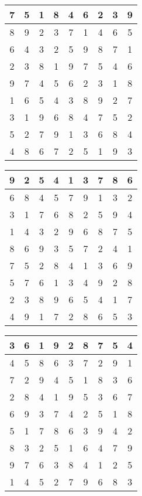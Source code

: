 \documentclass[]{article}
\begin{document}
\begin{table}[]
\begin{tabular}{c|c|c|c|c|c|c|c|c}
7 & 5 & 1 & 8 & 4 & 6 & 2 & 3 & 9 \\\hline
8 & 9 & 2 & 3 & 7 & 1 & 4 & 6 & 5 \\\hline
6 & 4 & 3 & 2 & 5 & 9 & 8 & 7 & 1 \\\hline
2 & 3 & 8 & 1 & 9 & 7 & 5 & 4 & 6 \\\hline
9 & 7 & 4 & 5 & 6 & 2 & 3 & 1 & 8 \\\hline
1 & 6 & 5 & 4 & 3 & 8 & 9 & 2 & 7 \\\hline
3 & 1 & 9 & 6 & 8 & 4 & 7 & 5 & 2 \\\hline
5 & 2 & 7 & 9 & 1 & 3 & 6 & 8 & 4 \\\hline
4 & 8 & 6 & 7 & 2 & 5 & 1 & 9 & 3 
\end{tabular}
\end{table}
\begin{table}[]
\begin{tabular}{c|c|c|c|c|c|c|c|c}
9 & 2 & 5 & 4 & 1 & 3 & 7 & 8 & 6 \\\hline
6 & 8 & 4 & 5 & 7 & 9 & 1 & 3 & 2 \\\hline
3 & 1 & 7 & 6 & 8 & 2 & 5 & 9 & 4 \\\hline
1 & 4 & 3 & 2 & 9 & 6 & 8 & 7 & 5 \\\hline
8 & 6 & 9 & 3 & 5 & 7 & 2 & 4 & 1 \\\hline
7 & 5 & 2 & 8 & 4 & 1 & 3 & 6 & 9 \\\hline
5 & 7 & 6 & 1 & 3 & 4 & 9 & 2 & 8 \\\hline
2 & 3 & 8 & 9 & 6 & 5 & 4 & 1 & 7 \\\hline
4 & 9 & 1 & 7 & 2 & 8 & 6 & 5 & 3 
\end{tabular}
\end{table}
\begin{table}[]
\begin{tabular}{c|c|c|c|c|c|c|c|c}
3 & 6 & 1 & 9 & 2 & 8 & 7 & 5 & 4 \\\hline
4 & 5 & 8 & 6 & 3 & 7 & 2 & 9 & 1 \\\hline
7 & 2 & 9 & 4 & 5 & 1 & 8 & 3 & 6 \\\hline
2 & 8 & 4 & 1 & 9 & 5 & 3 & 6 & 7 \\\hline
6 & 9 & 3 & 7 & 4 & 2 & 5 & 1 & 8 \\\hline
5 & 1 & 7 & 8 & 6 & 3 & 9 & 4 & 2 \\\hline
8 & 3 & 2 & 5 & 1 & 6 & 4 & 7 & 9 \\\hline
9 & 7 & 6 & 3 & 8 & 4 & 1 & 2 & 5 \\\hline
1 & 4 & 5 & 2 & 7 & 9 & 6 & 8 & 3 
\end{tabular}
\end{table}
\end{document}
